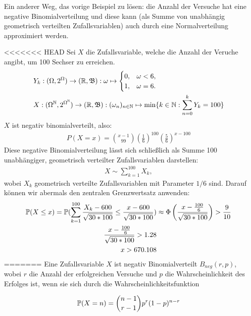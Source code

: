 \begin{exercise}

Ein anderer Weg, das vorige Beispiel zu lösen: die Anzahl der Versuche hat eine negative Binomialverteilung und diese kann (als Summe von unabhängig geometrisch verteilten Zufallsvariablen) auch durch eine Normalverteilung approximiert werden.

\end{exercise}

\begin{solution}

<<<<<<< HEAD
Sei $X$ die Zufallsvariable, welche die Anzahl der Veruche angibt, um 100 Sechser zu erreichen.
\begin{align*}
&Y_k:(\Omega,2^\Omega) \to (\R,\B): \omega \mapsto
\begin{cases}
    0, & \omega < 6, \\
    1, & \omega = 6.
\end{cases} \\
    &X:(\Omega^\N,2^{\Omega^\N}) \to (\R, \B): (\omega_n)_{n\in\N} \mapsto \min\{k\in\N: \sum_{n = 0}^kY_k = 100\}
\end{align*}
$X$ ist negativ binomialverteilt, also:
\begin{align*}
  P(X=x) = {x - 1\choose 99}(\frac{1}{6})^{100}(\frac{5}{6})^{x-100}
\end{align*}
Diese negative Binomialverteilung lässt sich schließlich als Summe 100 unabhängiger, geometrisch verteilter Zufallsvariablen darstellen:
\begin{align*}
  X \sim \sum_{k=1}^{100}X_k,
\end{align*}
wobei $X_k$ geometrisch verteilte Zufallsvariablen mit Parameter $1/6$ sind.
Darauf können wir abermals den zentralen Grenzwertsatz anwenden:
\begin{align*}
  \P(X \leq x) = \P(\sum_{k=1}^{100}\frac{X_k - 600}{\sqrt{30*100}} \leq \frac{x-600}{\sqrt{30*100}}) &\approx \Phi\pbraces{\frac{x-\frac{100}{6}}{\sqrt{30*100}}}  > \frac{9}{10} \\
  \frac{x-\frac{100}{6}}{\sqrt{30*100}} > 1.28 \\
  x > 670.108
\end{align*}
=======
Eine Zufallsvariable $X$ ist negativ Binomialverteilt $B_{neg} (r,p)$, wobei
$r$ die Anzahl der erfolgreichen Versuche und $p$ die Wahrscheinlichkeit
des Erfolges ist, wenn sie sich durch die Wahrscheinlichkeitsfunktion

\begin{align*}
  \P(X=n) = \binom{n-1}{r-1}p^r(1-p)^{n-r}
\end{align*}


\end{solution}
